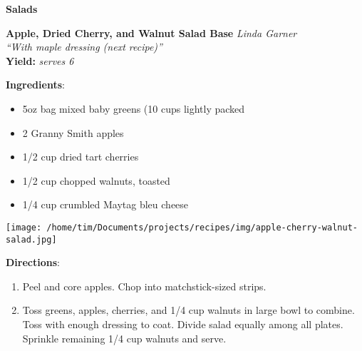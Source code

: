 \documentclass[11pt, twoside, openany]{book}
\begin{document}
{\newpage \LARGE \textbf{Salads}} \label{salads}\\
\noindent\begin{minipage}[t]{\linewidth}%
{\Large\textbf{Apple, Dried Cherry, and Walnut Salad Base}} \label{apple,-dried-cherry,-and-walnut-salad-base}\hfill\textit{Linda Garner}\\
\textit{``With maple dressing (next recipe)''}\\
\textbf{Yield:} \textit{serves 6}\\
\noindent\begin{minipage}[t]{0.78\linewidth}%
\textbf{Ingredients}:\vspace{-3mm}
\begin{multicols}{2}
\begin{itemize}\setlength\itemsep{-1mm}
\item 5oz bag mixed baby greens (10 cups lightly packed
\item 2 Granny Smith apples
\item 1/2 cup dried tart cherries
\item 1/2 cup chopped walnuts, toasted
\item 1/4 cup crumbled Maytag bleu cheese
\end{itemize}
\end{multicols}
\end{minipage}
\noindent\begin{minipage}[t]{0.18\linewidth}
\centering \strut\vspace*{-\baselineskip}\newline
\texttt{[image: /home/tim/Documents/projects/recipes/img/apple-cherry-walnut-salad.jpg]}\\
\end{minipage}\vspace{3mm}
\textbf{Directions}:
\vspace{-3mm}\begin{enumerate}\setlength\itemsep{-1mm}
\item Peel and core apples. Chop into matchstick-sized strips.
\item Toss greens, apples, cherries, and 1/4 cup walnuts in large bowl to combine. Toss with enough dressing to coat. Divide salad equally among all plates. Sprinkle remaining 1/4 cup walnuts and serve.
\end{enumerate}
\end{minipage}\vspace{8mm}
\end{document}
